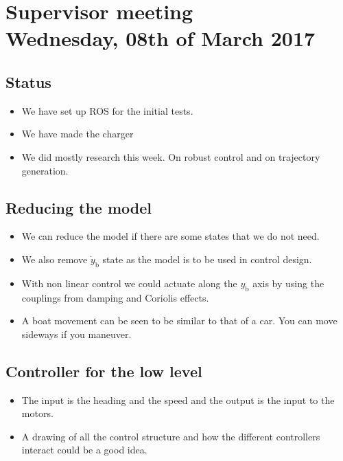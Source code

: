 
\renewcommand{\vec}[1]{\boldsymbol{\mathbf{#1}}}

\renewcommand\chaptername{KAPITEL}
\renewcommand\contentsname{Indhold}
\renewcommand\figurename{Figur}
\renewcommand\tablename{Tabel}

\section*{Supervisor meeting\\ \small Wednesday, 08th of March 2017}
\subsection{Status}
\begin{itemize}
	\item We have set up ROS for the initial tests.
	\item We have made the charger
	\item We did mostly research this week. On robust control and on trajectory generation.
\end{itemize}	
\subsection{Reducing the model}
\begin{itemize}
	\item We can reduce the model if there are some states that we do not need.
	\item We also remove $\dot{y}_\mathrm{b}$ state as the model is to be used in control design.
	\item With non linear control we could actuate along the $y_\mathrm{b}$ axis by using the couplings from damping and Coriolis effects.
	\item A boat movement can be seen to be similar to that of a car. You can move sideways if you maneuver.
\end{itemize}	
\subsection{Controller for the low level}
\begin{itemize}
	\item The input is the heading and the speed and the output is the input to the motors.
	\item A drawing of all the control structure and how the different controllers interact could be a good idea.
\end{itemize}
